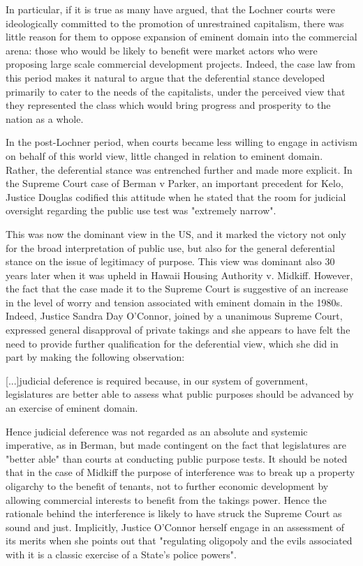 In particular, if it is true as many have argued, that the Lochner courts were ideologically committed to the promotion of unrestrained capitalism, there was little reason for them to oppose expansion of eminent domain into the commercial arena: those who would be likely to benefit were market actors who were proposing large scale commercial development projects. Indeed, the case law from this period makes it natural to argue that the deferential stance developed primarily to cater to the needs of the capitalists, under the perceived view that they represented the class which would bring progress and prosperity to the nation as a whole.

In the post-Lochner period, when courts became less willing to engage in activism on behalf of this world view,  little changed in relation to eminent domain. Rather, the deferential stance was entrenched further and made more explicit. In the Supreme Court case of Berman v Parker, an important precedent for Kelo, Justice Douglas codified this attitude when he stated that the room for judicial oversight regarding the public use test was "extremely narrow". 

This was now the dominant view in the US, and it marked the victory not only for the broad interpretation of public use, but also for the general deferential stance on the issue of legitimacy of purpose. This view was dominant also 30 years later when it was upheld in Hawaii Housing Authority v. Midkiff.  However, the fact that the case made it to the Supreme Court is suggestive of an increase in the level of worry and tension associated with eminent domain in the 1980s. Indeed, Justice Sandra Day O'Connor, joined by a unanimous Supreme Court, expressed general disapproval of private takings and she appears to have felt the need to provide further qualification for the deferential view, which she did in part by making the following observation:

[...]judicial deference is required because, in our system of government, legislatures are better able to assess what public purposes should be advanced by an exercise of eminent domain.

Hence judicial deference was not regarded as an absolute and systemic imperative, as in Berman, but made contingent on the fact that legislatures are "better able" than courts at conducting public purpose tests. It should be noted that in the case of Midkiff the purpose of interference was to break up a property oligarchy to the benefit of tenants, not to further economic development by allowing commercial interests to benefit from the takings power. Hence the rationale behind the interference is likely to have struck the Supreme Court as sound and just. Implicitly, Justice O'Connor herself engage in an assessment of its merits when she points out that "regulating oligopoly and the evils associated with it is a classic exercise of a State's police powers".

